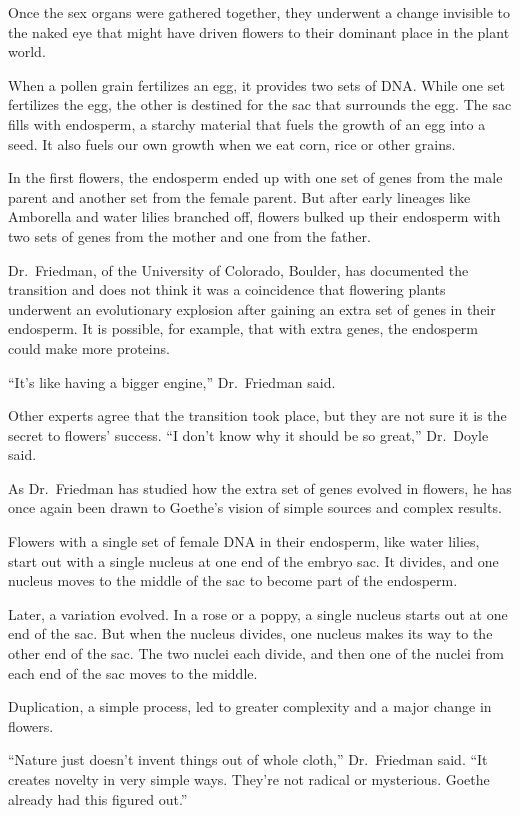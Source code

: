 ﻿\documentclass[12pt]{article}
\begin{document}
Once the sex organs were gathered together, they underwent a change invisible to the naked eye that
might have driven flowers to their dominant place in the plant world.

When a pollen grain fertilizes an egg, it provides two sets of DNA. While one set fertilizes the
egg, the other is destined for the sac that surrounds the egg. The sac fills with endosperm, a
starchy material that fuels the growth of an egg into a seed. It also fuels our own growth when we
eat corn, rice or other grains.

In the first flowers, the endosperm ended up with one set of genes from the male parent and another
set from the female parent. But after early lineages like Amborella and water lilies branched off,
flowers bulked up their endosperm with two sets of genes from the mother and one from the father.

Dr.~Friedman, of the University of Colorado, Boulder, has documented the transition and does not
think it was a coincidence that flowering plants underwent an evolutionary explosion after gaining
an extra set of genes in their endosperm. It is possible, for example, that with extra genes, the
endosperm could make more proteins.

``It's like having a bigger engine,'' Dr.~Friedman said.

Other experts agree that the transition took place, but they are not sure it is the secret to
flowers' success. ``I don't know why it should be so great,'' Dr.~Doyle said.

As Dr.~Friedman has studied how the extra set of genes evolved in flowers, he has once again been
drawn to Goethe's vision of simple sources and complex results.

Flowers with a single set of female DNA in their endosperm, like water lilies, start out with a
single nucleus at one end of the embryo sac. It divides, and one nucleus moves to the middle of the
sac to become part of the endosperm.

Later, a variation evolved. In a rose or a poppy, a single nucleus starts out at one end of the sac.
But when the nucleus divides, one nucleus makes its way to the other end of the sac. The two nuclei
each divide, and then one of the nuclei from each end of the sac moves to the middle.

Duplication, a simple process, led to greater complexity and a major change in flowers.

``Nature just doesn't invent things out of whole cloth,'' Dr.~Friedman said. ``It creates novelty in
very simple ways. They're not radical or mysterious. Goethe already had this figured out.''
\end{document}
